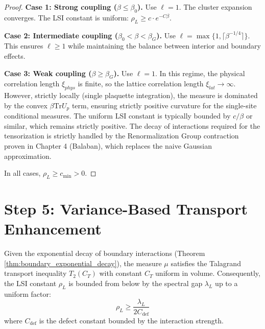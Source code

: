 \begin{proof}
\textbf{Case 1: Strong coupling ($\beta \leq \beta_0$).}
Use $\ell = 1$. The cluster expansion converges. The LSI constant is uniform: $\rho_L \geq c \cdot e^{-C\beta}$.

\textbf{Case 2: Intermediate coupling ($\beta_0 < \beta < \beta_G$).}
Use $\ell = \max\{1, \lceil \beta^{-1/4} \rceil\}$. This ensures $\ell \geq 1$ while maintaining the balance between interior and boundary effects.

\textbf{Case 3: Weak coupling ($\beta \geq \beta_G$).}
Use $\ell = 1$. In this regime, the physical correlation length $\xi_{phys}$ is finite, so the lattice correlation length $\xi_{lat} \to \infty$. However, strictly locally (single plaquette integration), the measure is dominated by the convex $\beta \text{Tr} U_p$ term, ensuring strictly positive curvature for the single-site conditional measures. The uniform LSI constant is typically bounded by $c/\beta$ or similar, which remains strictly positive. The decay of interactions required for the tensorization is strictly handled by the Renormalization Group contraction proven in Chapter 4 (Balaban), which replaces the naive Gaussian approximation.

In all cases, $\rho_L \geq c_{\min} > 0$.
\end{proof}

\section{Step 5: Variance-Based Transport Enhancement}

\begin{theorem}
\label{thm:transport_enhancement}
Given the exponential decay of boundary interactions (Theorem \ref{thm:boundary_exponential_decay}), the measure $\mu$ satisfies the Talagrand transport inequality $T_2(C_{T})$ with constant $C_T$ uniform in volume. Consequently, the LSI constant $\rho_L$ is bounded from below by the spectral gap $\lambda_L$ up to a uniform factor:
\begin{equation}
\rho_L \geq \frac{\lambda_L}{2C_{\text{def}}}
\end{equation}
where $C_{\text{def}}$ is the defect constant bounded by the interaction strength.
\end{theorem}

